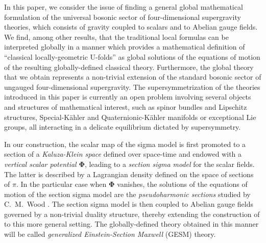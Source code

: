 \documentclass[10pt, cmp, numbook, final, a4paper]{svjour}
\def\bPhi{\mathbf{\Phi}}
\begin{document}
In this paper, we consider the issue of finding a general global
mathematical formulation of the universal bosonic sector of
four-dimensional supergravity theories, which consists of gravity
coupled to scalars and to Abelian gauge fields. We find, among other
results, that the traditional local formulas
\cite{Andrianopoli,AndrianopoliII,Aschieri,GaillardZumino,Ortin,FreedmanProeyen}
can be interpreted globally in a manner which provides a mathematical
definition of ``classical locally-geometric U-folds'' as global
solutions of the equations of motion of the resulting globally-defined
classical theory. Furthermore, the global theory that we obtain
represents a non-trivial extension of the standard bosonic sector of
ungauged four-dimensional supergravity. The supersymmetrization of the
theories introduced in this paper is currently an open problem
involving several objects and structures of mathematical interest,
such as spinor bundles and Lipschitz structures, Special-K\"ahler and
Quaternionic-K\"ahler manifolds or exceptional Lie groups, all
interacting in a delicate equilibrium dictated by supersymmetry. 

In our construction, the scalar map of the sigma model is first
promoted to a section of a {\em Kaluza-Klein space}
defined over space-time and endowed with a {\em vertical scalar
  potential} $\bPhi$, leading to a {\em section sigma model} for the
scalar fields. The latter is described by a Lagrangian density defined
on the space of sections of $\pi$. In the particular case when $\bPhi$
vanishes, the solutions of the equations of motion of the section
sigma model are the {\em pseudoharmonic sections} studied by
C.~M.~Wood \cite{Wood1,Wood2,Wood3,Wood4,Wood5,Wood6}. The section
sigma model is then coupled to Abelian gauge fields governed by a
non-trivial duality structure, thereby extending the construction of
\cite{GESM} to this more general setting. The globally-defined theory
obtained in this manner will be called {\em generalized
  Einstein-Section Maxwell} (GESM) theory.
\end{document}
